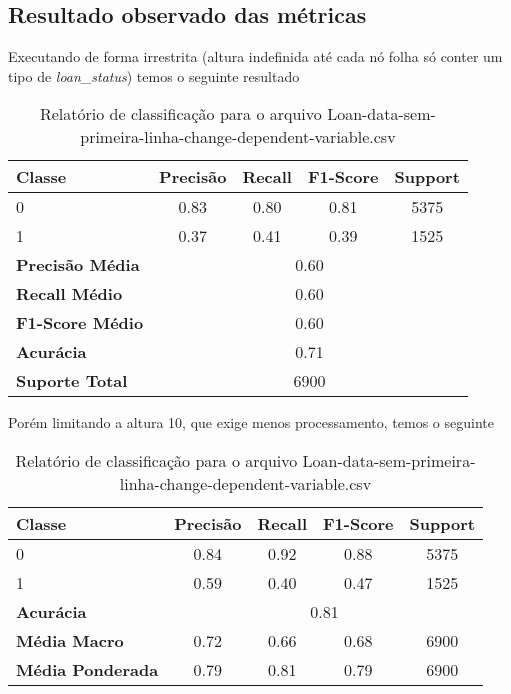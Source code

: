 \documentclass[12pt]{article}
\begin{document}
\subsection{Resultado observado das métricas}
Executando de forma irrestrita (altura indefinida até cada nó folha só conter um tipo de \textit{loan\_status}) temos o seguinte resultado
\begin{table}[h]
	\centering
	\begin{tabular}{lcccc}
		\hline
		\textbf{Classe} & \textbf{Precisão} & \textbf{Recall} & \textbf{F1-Score} & \textbf{Support} \\ \hline
		0                & 0.83              & 0.80               & 0.81               & 5375              \\
		1                & 0.37              & 0.41               & 0.39               & 1525              \\ \hline
		\textbf{Precisão Média} & \multicolumn{4}{c}{0.60} \\
		\textbf{Recall Médio} & \multicolumn{4}{c}{0.60} \\
		\textbf{F1-Score Médio} & \multicolumn{4}{c}{0.60} \\
		\textbf{Acurácia} & \multicolumn{4}{c}{0.71} \\
		\textbf{Suporte Total} & \multicolumn{4}{c}{6900} \\ \hline
	\end{tabular}
	\caption{Relatório de classificação para o arquivo Loan-data-sem-primeira-linha-change-dependent-variable.csv}
	\label{tab:class_report}
\end{table}

Porém limitando a altura 10, que exige menos processamento, temos o seguinte

\begin{table}[h]
	\centering
	\begin{tabular}{lcccc}
		\hline
		\textbf{Classe} & \textbf{Precisão} & \textbf{Recall} & \textbf{F1-Score} & \textbf{Support} \\ \hline
		0                & 0.84              & 0.92               & 0.88               & 5375              \\
		1                & 0.59              & 0.40               & 0.47               & 1525              \\ \hline
		\textbf{Acurácia} & \multicolumn{4}{c}{0.81} \\
		\textbf{Média Macro} & 0.72 & 0.66 & 0.68 & 6900 \\
		\textbf{Média Ponderada} & 0.79 & 0.81 & 0.79 & 6900 \\ \hline
	\end{tabular}
	\caption{Relatório de classificação para o arquivo Loan-data-sem-primeira-linha-change-dependent-variable.csv}
	\label{tab:class_report}
\end{table}
\end{document}
